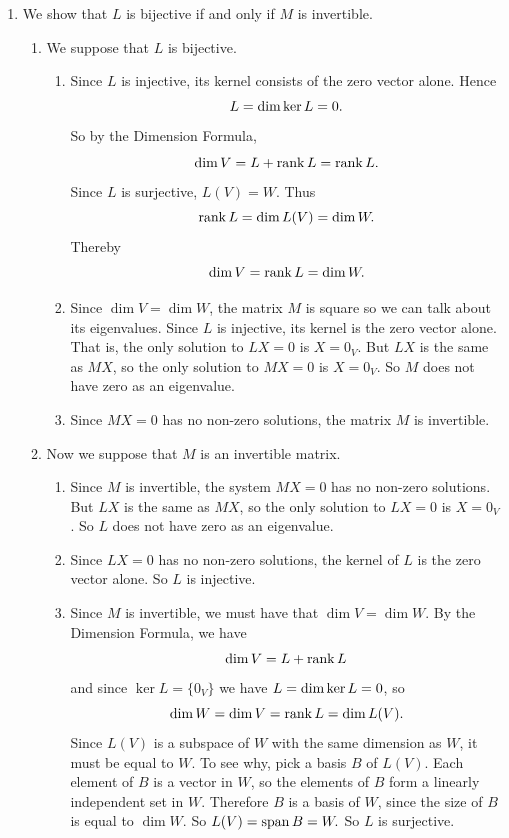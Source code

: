 \begin{enumerate}
\item  We  show  that  \(L\)  is  bijective  if  and  only  if  \(M\)  is  invertible.
 		\begin{enumerate}
 		\item  We  suppose  that  \(L\)  is  bijective.
 		\begin{enumerate}
 		\item  Since  \(L\)  is  injective,  its  kernel  consists  of  the  zero  vector  alone.  Hence
 		\[
 		\null  L=\dim  \ker  L=0.
 		\]
 		So  by  the  Dimension  Formula,
 		\[
 		\dim  V=\null  L+\rank  L=\rank  L.
 		\]
 		Since  \(L\)  is  surjective,  \(L(V)=W.\)  Thus
 		\[
 		\operatorname{rank}  L=\dim  L(V)=\dim  W.
 		\]
 		Thereby  \[\dim  V=\operatorname{rank}  L=\dim  W.\]
 		\item  Since  \(\dim  V=\dim  W\),  the  matrix  \(M\)  is  square  so  we  can  talk  about  its  eigenvalues.  Since  \(L\)  is  injective,  its  kernel  is  the  zero  vector  alone.  That  is,  the  only  solution  to  \(LX=0\)  is  \(X=0_V\).  But  \(LX\)  is  the  same  as  \(MX\),  so  the  only  solution  to  \(MX=0\)  is  \(X=0_V\).  So  \(M\)  does  not  have  zero  as  an  eigenvalue.
 		\item  Since  \(MX=0\)  has  no  non-zero  solutions,  the  matrix  \(M\)  is  invertible.
	\end{enumerate}
 		\item  Now  we  suppose  that  \(M\)  is  an  invertible  matrix.
 		\begin{enumerate}
 		\item  Since  \(M\)  is  invertible,  the  system  \(MX=0\)  has  no  non-zero  solutions.  But  \(LX\)  is  the  same  as  \(MX\),  so  the  only  solution  to  \(LX=0\)  is  \(X=0_V\).  So  \(L\)  does  not  have  zero  as  an  eigenvalue.
 		\item  Since  \(LX=0\)  has  no  non-zero  solutions,  the  kernel  of  \(L\)  is  the  zero  vector  alone.  So  \(L\)  is  injective.
 		\item  Since  \(M\)  is  invertible,  we  must  have  that  \(\dim  V=\dim  W\).  By  the  Dimension  Formula,  we  have
 		\[
 		\dim  V=\null  L+\rank  L
 		\]
 		and  since  \(\ker  L=\{0_V\}\)  we  have  \(\null  L=\dim  \ker  L=0\),  so
 		\[
 		\dim  W=\dim  V=\operatorname{rank}  L=\dim  L(V).
 		\]
 		Since  \(L(V)\)  is  a  subspace  of  \(W\)  with  the  same  dimension  as  \(W\),  it  must  be  equal  to  \(W\).  To  see  why,  pick  a  basis  \(B\)  of  \(L(V)\).  Each  element  of  \(B\)  is  a  vector  in  \(W\),  so  the  elements  of  \(B\)  form  a  linearly  independent  set  in  \(W\).  Therefore  \(B\)  is  a  basis  of  \(W\),  since  the  size  of  \(B\)  is  equal  to  \(\dim  W\).  So  \(L(V)=\operatorname{span}  B=W.\)  So  \(L\)  is  surjective.
 		\end{enumerate}
 		\end{enumerate}


\end{enumerate}

